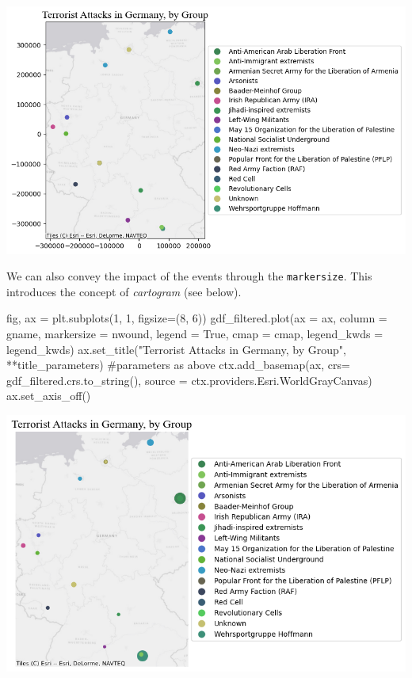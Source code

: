 \documentclass[
  letterpaper,
  DIV=11,
  numbers=noendperiod]{scrreprt}
\newenvironment{Shaded}{\begin{snugshade}}{\end{snugshade}}
\newcommand{\CommentTok}[1]{\textcolor[rgb]{0.37,0.37,0.37}{#1}}
\newcommand{\DecValTok}[1]{\textcolor[rgb]{0.68,0.00,0.00}{#1}}
\newcommand{\NormalTok}[1]{\textcolor[rgb]{0.00,0.23,0.31}{#1}}
\newcommand{\OperatorTok}[1]{\textcolor[rgb]{0.37,0.37,0.37}{#1}}
\newcommand{\StringTok}[1]{\textcolor[rgb]{0.13,0.47,0.30}{#1}}
\newcommand{\VariableTok}[1]{\textcolor[rgb]{0.07,0.07,0.07}{#1}}
\begin{document}
\includegraphics{labs/w02_maps_files/figure-pdf/cell-47-output-1.png}

We can also convey the impact of the events through the
\texttt{markersize}. This introduces the concept of \emph{cartogram}
(see below).

\begin{Shaded}
\begin{Highlighting}[]
\NormalTok{fig, ax }\OperatorTok{=}\NormalTok{ plt.subplots(}\DecValTok{1}\NormalTok{, }\DecValTok{1}\NormalTok{, figsize}\OperatorTok{=}\NormalTok{(}\DecValTok{8}\NormalTok{, }\DecValTok{6}\NormalTok{))}
\NormalTok{gdf\_filtered.plot(ax }\OperatorTok{=}\NormalTok{ ax, column }\OperatorTok{=} \StringTok{\textquotesingle{}gname\textquotesingle{}}\NormalTok{, markersize }\OperatorTok{=} \StringTok{\textquotesingle{}nwound\textquotesingle{}}\NormalTok{, legend }\OperatorTok{=} \VariableTok{True}\NormalTok{, cmap }\OperatorTok{=}\NormalTok{ cmap, legend\_kwds }\OperatorTok{=}\NormalTok{ legend\_kwds)}
\NormalTok{ax.set\_title(}\StringTok{"Terrorist Attacks in Germany, by Group"}\NormalTok{, }\OperatorTok{**}\NormalTok{title\_parameters) }\CommentTok{\#parameters as above}
\NormalTok{ctx.add\_basemap(ax, crs}\OperatorTok{=}\NormalTok{ gdf\_filtered.crs.to\_string(), source }\OperatorTok{=}\NormalTok{ ctx.providers.Esri.WorldGrayCanvas)}
\NormalTok{ax.set\_axis\_off()}
\end{Highlighting}
\end{Shaded}

\includegraphics{labs/w02_maps_files/figure-pdf/cell-48-output-1.png}
\end{document}
